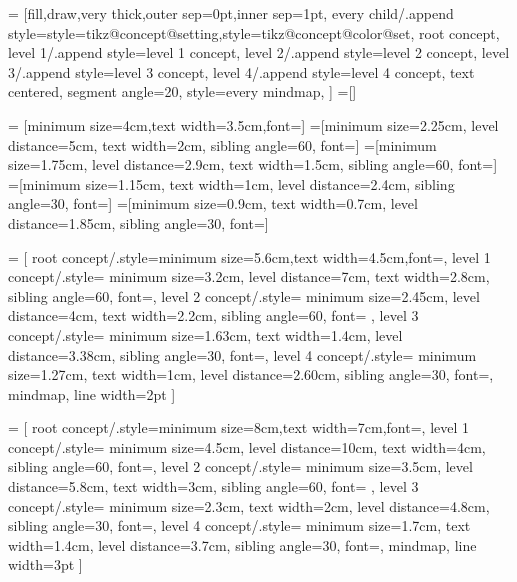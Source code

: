 
=
  [fill,draw,very thick,outer sep=0pt,inner sep=1pt,%
   every child/.append style={style=tikz@concept@setting,style=tikz@concept@color@set},%
   root concept,
   level 1/.append style={level 1 concept},
   level 2/.append style={level 2 concept},
   level 3/.append style={level 3 concept},
   level 4/.append style={level 4 concept},
   text centered,%
   segment angle=20,
   style=every mindmap,
  ]
=[]


=   [minimum size=4cm,text width=3.5cm,font=\pgfutil@font@large]
=[minimum size=2.25cm,
                             level distance=5cm,
                             text width=2cm,
                             sibling angle=60,
                             font=\pgfutil@font@small]
=[minimum size=1.75cm,%
                             level distance=2.9cm,%
                             text width=1.5cm,%
                             sibling angle=60,%
                             font=\pgfutil@font@footnotesize]
=[minimum size=1.15cm,%
                             text width=1cm,%
                             level distance=2.4cm,%
                             sibling angle=30,%
                             font=\pgfutil@font@tiny]
=[minimum size=0.9cm,%
                             text width=0.7cm,
                             level distance=1.85cm,%
                             sibling angle=30,%
                             font=\pgfutil@font@tiny]
  
=
  [%
  root concept/.style={minimum size=5.6cm,text width=4.5cm,font=\pgfutil@font@Large},
  level 1 concept/.style={%
    minimum size=3.2cm,
    level distance=7cm,
    text width=2.8cm,
    sibling angle=60,
    font=},%
  level 2 concept/.style={%
    minimum size=2.45cm,%
    level distance=4cm,%
    text width=2.2cm,%
    sibling angle=60,%
    font=\pgfutil@font@small%
    },%
  level 3 concept/.style={%
    minimum size=1.63cm,%
    text width=1.4cm,%
    level distance=3.38cm,%
    sibling angle=30,%
    font=\pgfutil@font@scriptsize},%
  level 4 concept/.style={%
    minimum size=1.27cm,%
    text width=1cm,
    level distance=2.60cm,%
    sibling angle=30,%
    font=\pgfutil@font@tiny},%
  mindmap,%
  line width=2pt
  ]
  
=
  [%
  root concept/.style={minimum size=8cm,text width=7cm,font=\pgfutil@font@huge},
  level 1 concept/.style={%
    minimum size=4.5cm,
    level distance=10cm,
    text width=4cm,
    sibling angle=60,
    font=\pgfutil@font@large},%
  level 2 concept/.style={%
    minimum size=3.5cm,%
    level distance=5.8cm,%
    text width=3cm,%
    sibling angle=60,%
    font=%
    },%
  level 3 concept/.style={%
    minimum size=2.3cm,%
    text width=2cm,%
    level distance=4.8cm,%
    sibling angle=30,%
    font=\pgfutil@font@footnotesize},%
  level 4 concept/.style={%
    minimum size=1.7cm,%
    text width=1.4cm,
    level distance=3.7cm,%
    sibling angle=30,%
    font=\pgfutil@font@scriptsize},%
  mindmap,%
  line width=3pt
  ]
  


